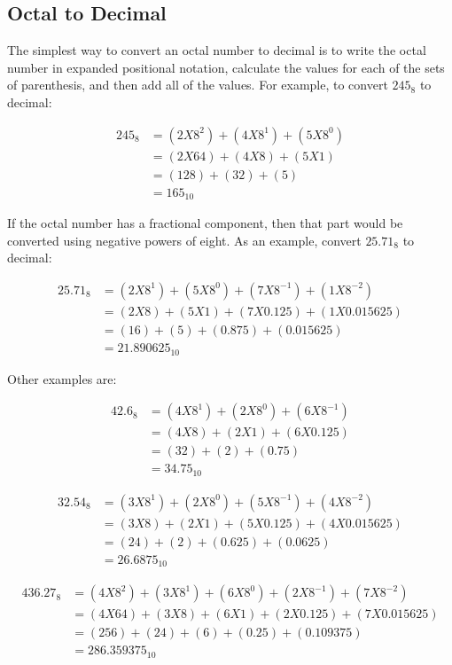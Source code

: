 \subsection{Octal to Decimal}
\label{MF:sub:octal_to_decimal}
The simplest way to convert an octal number to decimal is to write the octal number in expanded positional notation, calculate the values for each of the sets of parenthesis, and then add all of the values. For example, to convert $ 245_8 $ to decimal:

\begin{align}
  245_8 &= (2X8^2)+(4X8^1)+(5X8^0) \\
  \nonumber
  &= (2X64)+(4X8)+(5X1) \\
  \nonumber
  &= (128)+(32)+(5) \\
  \nonumber
  &= 165_{10}
\end{align}

If the octal number has a fractional component, then that part would be converted using negative powers of eight. As an example, convert $ 25.71_8 $ to decimal: 

\begin{align}
  25.71_8 &= (2X8^1)+(5X8^0)+(7X8^{-1})+(1X8^{-2}) \\
  \nonumber
  &= (2X8)+(5X1)+(7X0.125)+(1X0.015625) \\
  \nonumber
  &= (16)+(5)+(0.875)+(0.015625) \\
  \nonumber
  &= 21.890625_{10}
\end{align}

Other examples are:

\begin{align}
  42.6_8 &= (4X8^1)+(2X8^0)+(6X8^{-1}) \\
  \nonumber
  &= (4X8)+(2X1)+(6X0.125) \\
  \nonumber
  &= (32)+(2)+(0.75) \\
  \nonumber
  &= 34.75_{10}
\end{align}

\begin{align}
  32.54_8 &= (3X8^1)+(2X8^0)+(5X8^{-1})+(4X8^{-2}) \\
  \nonumber
  &= (3X8)+(2X1)+(5X0.125)+(4X0.015625) \\
  \nonumber
  &= (24)+(2)+(0.625)+(0.0625) \\
  \nonumber
  &= 26.6875_{10}
\end{align}

\begin{align}
  436.27_8 &= (4X8^2)+(3X8^1)+(6X8^0)+(2X8^{-1})+(7X8^{-2}) \\
  \nonumber
  &= (4X64)+(3X8)+(6X1)+(2X0.125)+(7X0.015625) \\
  \nonumber
  &= (256)+(24)+(6)+(0.25)+(0.109375) \\
  \nonumber
  &= 286.359375_{10}
\end{align}

